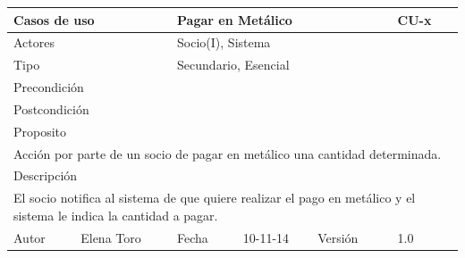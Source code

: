\documentclass{article}
\begin{document}
\begin{table}[ht]
\begin{tabular}{|l|l|l|l|l|l|}
\hline
\multicolumn{2}{|p{2cm}|}{Casos de uso}  & \multicolumn{3}{p{7cm}|}{Pagar en Metálico} & CU-x \\
\hline
\multicolumn{2}{|p{2cm}|}{Actores}       & \multicolumn{4}{p{8cm}|}{Socio(I), Sistema}        \\
\hline
\multicolumn{2}{|p{2cm}|}{Tipo}          & \multicolumn{4}{p{8cm}|}{Secundario, Esencial}        \\
\hline
\multicolumn{2}{|p{2cm}|}{Precondición}  & \multicolumn{4}{p{8cm}|}{}        \\
\hline
\multicolumn{2}{|p{2cm}|}{Postcondición} & \multicolumn{4}{p{8cm}|}{}        \\
\hline
\multicolumn{6}{|p{10cm}|}{Proposito}                                   \\
\hline
\multicolumn{6}{|p{10cm}|}{Acción por parte de un socio de pagar en metálico una cantidad determinada.}                                            \\
\hline
\multicolumn{6}{|p{10cm}|}{Descripción}                                 \\
\hline
\multicolumn{6}{|p{10cm}|}{El socio notifica al sistema de que quiere realizar el pago en metálico y el sistema le indica la cantidad a pagar.}                                            \\
\hline
Autor           &Elena Toro              & Fecha    &10-11-14     &   Versión  &1.0\\
\hline
\end{tabular}
\end{table}
\end{document}

